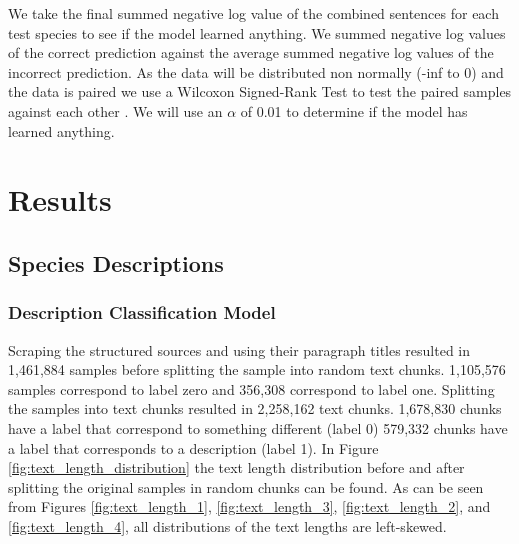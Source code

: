 \documentclass[a4paper, 12pt, oneside]{book} %
\begin{document}
We take the final summed negative log  value of the combined sentences for each test species to see if the model learned anything.
We summed negative log values of the correct prediction against the average summed negative log values of the incorrect prediction.
As the data will be distributed non normally (-inf to 0) and the data is paired we use a Wilcoxon Signed-Rank Test to test the paired samples against each other \autocite{wilcoxon_individual_1945}.
We will use an \(\alpha\) of 0.01 to determine if the model has learned anything. 




\newpage
\section{Results} \label{par:results}
\subsection{Species Descriptions}
\subsubsection{Description Classification Model}
Scraping the structured sources and using their paragraph titles resulted in 1,461,884 samples before splitting the sample into random text chunks.
1,105,576 samples correspond to label zero and 356,308 correspond to label one.
Splitting the samples into text chunks resulted in 2,258,162 text chunks.
1,678,830 chunks have a label that correspond to something different (label 0) 579,332 chunks have a label that corresponds to a description (label 1).
In Figure \ref{fig:text_length_distribution} the text length distribution before and after splitting the original samples in random chunks can be found.
As can be seen from Figures \ref{fig:text_length_1}, \ref{fig:text_length_3}, \ref{fig:text_length_2}, and \ref{fig:text_length_4}, all distributions of the text lengths are left-skewed. 
\end{document}
